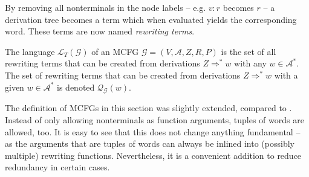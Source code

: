 \documentclass[
    a4paper,
    12pt,
    twoside,
    BCOR=12mm,
    parskip=half,
    chapterprefix,
    numbers=noenddot,
    bibliography=totoc
]{scrbook}
\begin{document}
By removing all nonterminals in the node labels -- e.g. $v : r$ becomes $r$ -- a derivation tree becomes a term which when evaluated yields the corresponding word. These terms are now named \emph{rewriting terms}.

The language $\mathcal{L}_T(\mathcal{G})$ of an \gls{MCFG} $\mathcal{G}=(V,\mathcal{A},Z,R,P)$ is the set of all rewriting terms that can be created from derivations $Z \Rightarrow^* w$ with any $w \in \mathcal{A}^*$. The set of rewriting terms that can be created from derivations $Z \Rightarrow^* w$ with a given $w \in \mathcal{A}^*$ is denoted $\mathcal{Q}_\mathcal{G}(w)$.


\begin{remark}
	The definition of \glspl{MCFG} in this section was slightly extended, compared to \citet{seki_generative_2008}. Instead of only allowing nonterminals as function arguments, tuples of words are allowed, too. It is easy to see that this does not change anything fundamental -- as the  arguments that are tuples of words can always be inlined into (possibly multiple) rewriting functions. Nevertheless, it is a convenient addition to reduce redundancy in certain cases.
\end{remark}

\newpage
\end{document}
